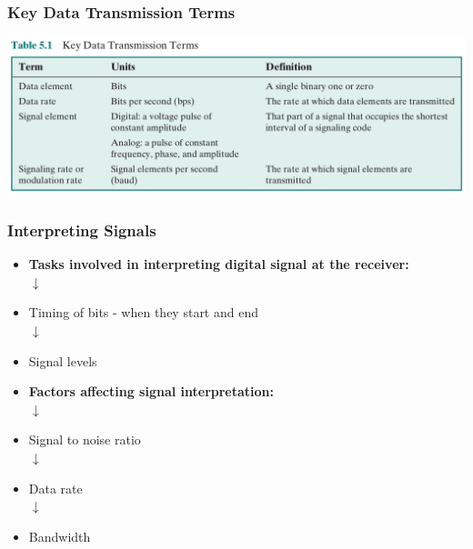 \documentclass[pdflatex,compress]{beamer}
\begin{document}
\begin{frame}
	\frametitle{Key Data Transmission Terms}
	\begin{center}
		\includegraphics[width=\linewidth]{img/img02}
	\end{center}
\end{frame}

\begin{frame}
	\frametitle{Interpreting Signals}
	\begin{multicols}{2}
		\begin{itemize}
			\centering
			\item[] \textbf{Tasks involved in interpreting digital signal at the receiver:}\\
			\centering $ \downarrow $
			\item[] Timing of bits - when they start and end\\
			\centering $ \downarrow $
			\item[] Signal levels
		\end{itemize}
	\columnbreak
		\begin{itemize}
			\centering
			\item[] \textbf{Factors affecting signal interpretation:}\\
			\centering $ \downarrow $
			\item[] Signal to noise ratio\\
			\centering $ \downarrow $
			\item[] Data rate\\
			\centering $ \downarrow $
			\item[] Bandwidth
		\end{itemize}
	\end{multicols}
\end{frame}
\end{document}
